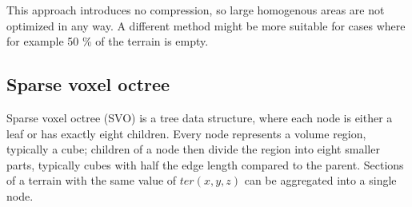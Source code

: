 This approach introduces no compression, so large homogenous areas are not optimized in any way. A different method might be more suitable for cases where for example 50 \% of the terrain is empty.

\subsection{Sparse voxel octree}
Sparse voxel octree (SVO) is a tree data structure, where each node is either a leaf or has exactly eight children. Every node represents a volume region, typically a cube; children of a node then divide the region into eight smaller parts, typically cubes with half the edge length compared to the parent. Sections of a terrain with the same value of $ter(x, y, z)$ can be aggregated into a single node.

